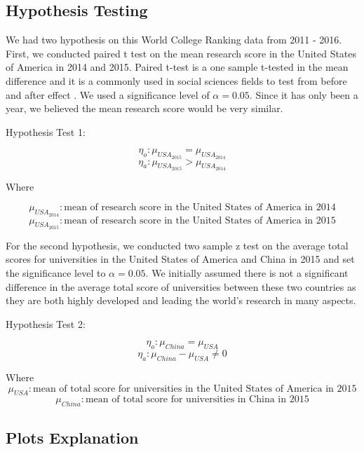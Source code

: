 \documentclass[a4paper]{article}
\begin{document}
\subsection* {Hypothesis Testing}
We had two hypothesis on this World College Ranking data from 2011 - 2016. First, we conducted paired t test on the mean research score in the United States of America in 2014 and 2015.  Paired t-test is a one sample t-tested in the mean difference and it is a commonly used in social sciences fields to test from before and after effect \cite{hedberg_ayers_2015}. We used a significance level of $\alpha = 0.05$. Since it has only been a year, we believed the mean research score would be very similar.\newline

Hypothesis Test 1:

$$\eta_o: \mu_{USA_{2015}} = \mu_{USA_{2014}}$$
$$\eta_a: \mu_{USA_{2015}} > \mu_{USA_{2014}}$$

Where

$$\mu_{USA_{2014}}: \text{mean of research score in the United States of America in 2014}$$
$$\mu_{USA_{2015}}: \text{mean of research score in the United States of America in 2015} $$\newline


For the second hypothesis, we conducted two sample z test on the average total scores for universities in the United States of America and China in 2015 and set the significance level to $\alpha = 0.05$. We initially assumed there is not a significant difference in the average total score of universities between these two countries as they are both highly developed and leading the world's research in many aspects.\newline 

Hypothesis Test 2:

$$\eta_o: \mu_{China} = \mu_{USA}$$
$$\eta_a: \mu_{China} - \mu_{USA} \neq 0$$

Where\newline 
$$\mu_{USA}: \text{mean of total score for universities in the United States of America in 2015}$$
$$\mu_{China}: \text{mean of total score for universities in China in 2015}$$

\subsection* {Plots Explanation}
\end{document}
